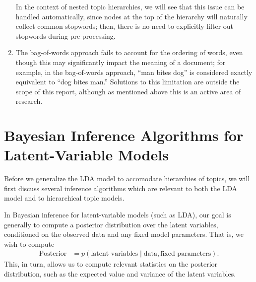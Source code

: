 \documentclass{article}
\begin{document}
\begin{enumerate}
In the context of nested topic hierarchies, we will see that this issue can be handled automatically, since nodes at the top of the hierarchy will naturally collect common stopwords; then, there is no need to explicitly filter out stopwords during pre-processing.
\item The bag-of-words approach fails to account for the ordering of words, even though this may significantly impact the meaning of a document; for example, in the bag-of-words approach, ``man bites dog'' is considered exactly equivalent to ``dog bites man.''
Solutions to this limitation are outside the scope of this report, although as mentioned above this is an active area of research.
\end{enumerate}

\section{Bayesian Inference Algorithms for Latent-Variable Models}

Before we generalize the LDA model to accomodate hierarchies of topics, we will first discuss several inference algorithms which are relevant to both the LDA model and to hierarchical topic models.

In Bayesian inference for latent-variable models (such as LDA), our goal is generally to compute a posterior distribution over the latent variables, conditioned on the observed data and any fixed model parameters.
That is, we wish to compute
\begin{align}
\text{Posterior} &= p(\text{latent variables} \mid \text{data}, \text{fixed parameters}).
\end{align}
This, in turn, allows us to compute relevant statistics on the posterior distribution, such as the expected value and variance of the latent variables.
\end{document}
